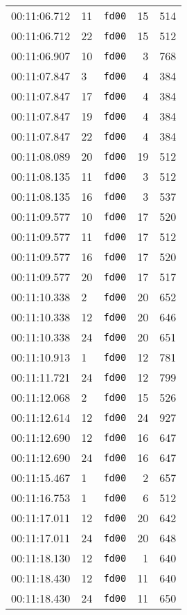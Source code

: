 \documentclass{article}
\begin{document}
\begin{longtable}{lllrr}
00:11:06.712 & 11 & \texttt{fd00} & 15 & 514 \\
00:11:06.712 & 22 & \texttt{fd00} & 15 & 512 \\
00:11:06.907 & 10 & \texttt{fd00} & 3 & 768 \\
00:11:07.847 & 3 & \texttt{fd00} & 4 & 384 \\
00:11:07.847 & 17 & \texttt{fd00} & 4 & 384 \\
00:11:07.847 & 19 & \texttt{fd00} & 4 & 384 \\
00:11:07.847 & 22 & \texttt{fd00} & 4 & 384 \\
00:11:08.089 & 20 & \texttt{fd00} & 19 & 512 \\
00:11:08.135 & 11 & \texttt{fd00} & 3 & 512 \\
00:11:08.135 & 16 & \texttt{fd00} & 3 & 537 \\
00:11:09.577 & 10 & \texttt{fd00} & 17 & 520 \\
00:11:09.577 & 11 & \texttt{fd00} & 17 & 512 \\
00:11:09.577 & 16 & \texttt{fd00} & 17 & 520 \\
00:11:09.577 & 20 & \texttt{fd00} & 17 & 517 \\
00:11:10.338 & 2 & \texttt{fd00} & 20 & 652 \\
00:11:10.338 & 12 & \texttt{fd00} & 20 & 646 \\
00:11:10.338 & 24 & \texttt{fd00} & 20 & 651 \\
00:11:10.913 & 1 & \texttt{fd00} & 12 & 781 \\
00:11:11.721 & 24 & \texttt{fd00} & 12 & 799 \\
00:11:12.068 & 2 & \texttt{fd00} & 15 & 526 \\
00:11:12.614 & 12 & \texttt{fd00} & 24 & 927 \\
00:11:12.690 & 12 & \texttt{fd00} & 16 & 647 \\
00:11:12.690 & 24 & \texttt{fd00} & 16 & 647 \\
00:11:15.467 & 1 & \texttt{fd00} & 2 & 657 \\
00:11:16.753 & 1 & \texttt{fd00} & 6 & 512 \\
00:11:17.011 & 12 & \texttt{fd00} & 20 & 642 \\
00:11:17.011 & 24 & \texttt{fd00} & 20 & 648 \\
00:11:18.130 & 12 & \texttt{fd00} & 1 & 640 \\
00:11:18.430 & 12 & \texttt{fd00} & 11 & 640 \\
00:11:18.430 & 24 & \texttt{fd00} & 11 & 650 \\

\end{longtable}
\end{document}
